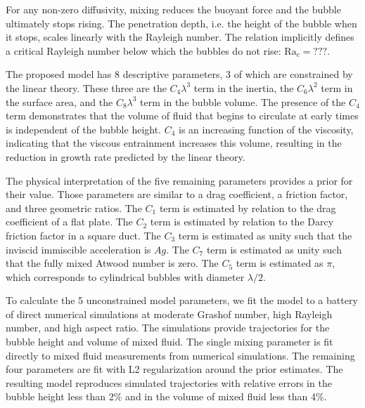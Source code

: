 For any non-zero diffusivity, mixing reduces the buoyant force and the bubble ultimately stops rising.
The penetration depth, i.e. the height of the bubble when it stops, scales linearly with the Rayleigh number.
The relation implicitly defines a critical Rayleigh number below which the bubbles do not rise: $\text{Ra}_c = ???$.

The proposed model has 8 descriptive parameters, 3 of which are constrained by the linear theory.
These three are the $C_4 \lambda^3$ term in the inertia, the $C_6 \lambda^2$ term in the surface area, and the $C_8 \lambda^3$ term in the bubble volume.
The presence of the $C_4$ term demonstrates that the volume of fluid that begins to circulate at early times is independent of the bubble height.
$C_4$ is an increasing function of the viscosity, indicating that the viscous entrainment increases this volume, resulting in the reduction in growth rate predicted by the linear theory.

The physical interpretation of the five remaining parameters provides a prior for their value.
Those parameters are similar to a drag coefficient, a friction factor, and three geometric ratios.
The $C_1$ term is estimated by relation to the drag coefficient of a flat plate.
The $C_2$ term is estimated by relation to the Darcy friction factor in a square duct.
The $C_3$ term is estimated as unity such that the inviscid immiscible acceleration is $Ag$.
The $C_7$ term is estimated as unity such that the fully mixed Atwood number is zero.
The $C_5$ term is estimated as $\pi$, which corresponds to cylindrical bubbles with diameter $\lambda / 2$.

To calculate the 5 unconstrained model parameters, we fit the model to a battery of direct numerical simulations at moderate Grashof number, high Rayleigh number, and high aspect ratio.
The simulations provide trajectories for the bubble height and volume of mixed fluid.
The single mixing parameter is fit directly to mixed fluid measurements from numerical simulations.
The remaining four parameters are fit with L2 regularization around the prior estimates.
The resulting model reproduces simulated trajectories with relative errors in the bubble height less than 2\% and in the volume of mixed fluid less than 4\%.

